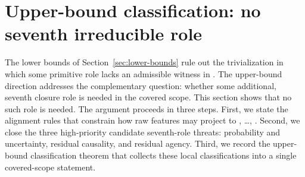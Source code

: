 \section{Upper-bound classification: no seventh irreducible role}\label{sec:upper-bound-classification}

%
%
%


The lower bounds of Section~\ref{sec:lower-bounds} rule out the
trivialization in which some primitive role lacks an admissible
witness in \FATCD{}. The upper-bound direction addresses the
complementary question: whether some additional, seventh closure role
is needed in the covered scope. This section shows that no such role
is needed. The argument proceeds in three steps. First, we state the
alignment rules that constrain how raw features may project to
\Pone{}, \ldots, \Psix{}. Second, we close the three high-priority
candidate seventh-role threats: probability and uncertainty, residual
causality, and residual agency. Third, we record the upper-bound
classification theorem that collects these local classifications into
a single covered-scope statement.

